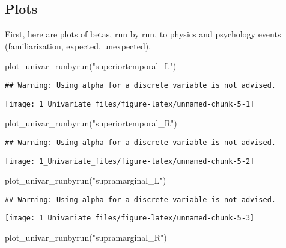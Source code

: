 \documentclass[
]{article}
\newenvironment{Shaded}{\begin{snugshade}}{\end{snugshade}}
\newcommand{\FunctionTok}[1]{\textcolor[rgb]{0.00,0.00,0.00}{#1}}
\newcommand{\NormalTok}[1]{#1}
\newcommand{\StringTok}[1]{\textcolor[rgb]{0.31,0.60,0.02}{#1}}
\begin{document}
\hypertarget{plots}{%
\subsection{Plots}\label{plots}}

First, here are plots of betas, run by run, to physics and psychology
events (familiarization, expected, unexpected).

\begin{Shaded}
\begin{Highlighting}[]
\FunctionTok{plot\_univar\_runbyrun}\NormalTok{(}\StringTok{"superiortemporal\_L"}\NormalTok{)}
\end{Highlighting}
\end{Shaded}

\begin{verbatim}
## Warning: Using alpha for a discrete variable is not advised.
\end{verbatim}

\texttt{[image: 1\_Univariate\_files/figure-latex/unnamed-chunk-5-1]}

\begin{Shaded}
\begin{Highlighting}[]
\FunctionTok{plot\_univar\_runbyrun}\NormalTok{(}\StringTok{"superiortemporal\_R"}\NormalTok{)}
\end{Highlighting}
\end{Shaded}

\begin{verbatim}
## Warning: Using alpha for a discrete variable is not advised.
\end{verbatim}

\texttt{[image: 1\_Univariate\_files/figure-latex/unnamed-chunk-5-2]}

\begin{Shaded}
\begin{Highlighting}[]
\FunctionTok{plot\_univar\_runbyrun}\NormalTok{(}\StringTok{"supramarginal\_L"}\NormalTok{)}
\end{Highlighting}
\end{Shaded}

\begin{verbatim}
## Warning: Using alpha for a discrete variable is not advised.
\end{verbatim}

\texttt{[image: 1\_Univariate\_files/figure-latex/unnamed-chunk-5-3]}

\begin{Shaded}
\begin{Highlighting}[]
\FunctionTok{plot\_univar\_runbyrun}\NormalTok{(}\StringTok{"supramarginal\_R"}\NormalTok{)}
\end{Highlighting}
\end{Shaded}
\end{document}
